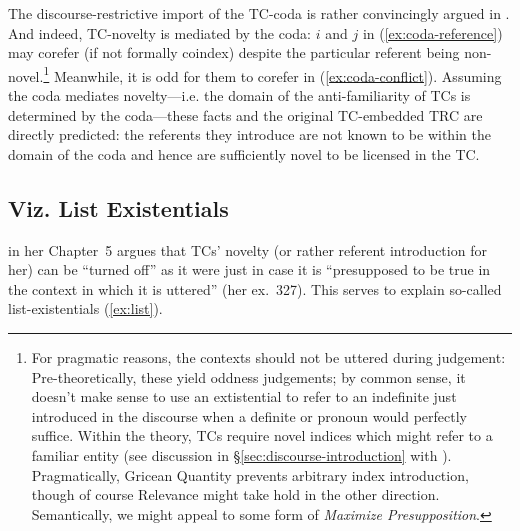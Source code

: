 \documentclass[11pt]{article}
\begin{document}
The discourse-restrictive import of the TC-coda is rather convincingly argued in \citet{zucchiIngredientsDefinitenessDefiniteness1995}. And indeed, TC-novelty is mediated by the coda: \(i\) and \(j\) in (\ref{ex:coda-reference}) may corefer (if not formally coindex) despite the particular referent being non-novel.\footnote{For pragmatic reasons, the contexts should not be uttered during judgement: Pre-theoretically, these yield oddness judgements; by common sense, it doesn't make sense to use an extistential to refer to an indefinite just introduced in the discourse when a definite or pronoun would perfectly suffice. Within the theory, TCs require novel indices which might refer to a familiar entity (see discussion in \S\ref{sec:discourse-introduction} with \cite{abbottDefinitenessExistentials1997}). Pragmatically, Gricean Quantity prevents arbitrary index introduction, though of course Relevance might take hold in the other direction. Semantically, we might appeal to some form of \textit{Maximize Presupposition}.} Meanwhile, it is odd for them to corefer in (\ref{ex:coda-conflict}). Assuming the coda mediates novelty---i.e. the domain of the anti-familiarity of TCs is determined by the coda---these facts and the original TC-embedded TRC are directly predicted: the referents they introduce are not known to be within the domain of the coda and hence are sufficiently novel to be licensed in the TC.

\begin{exe}
	\label{ex:coda-reference}
	\label{ex:coda-conflict}
\end{exe}

\subsection{Viz. List Existentials}\label{sec:list}
\citet{mcnallySemanticsEnglishExistential1997} in her Chapter~5 argues that TCs' novelty (or rather referent introduction for her) can be ``turned off'' as it were just in case it is ``presupposed to be true in the context in which it is uttered'' (her ex.~327). This serves to explain so-called list-existentials (\ref{ex:list}).

\begin{exe}
	\label{ex:list}
\end{exe}
\end{document}
